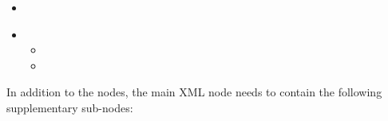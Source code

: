 %
\attrIntro

\begin{itemize}
  \itemsep0em
  \item \nameDescription
\end{itemize}


\begin{itemize}
  \item \variableDescription
    \variableChildrenIntro
    \begin{itemize}
      \item \distributionDescription
    \item \functionDescription
    \end{itemize}
\end{itemize}

In addition to the  nodes, the main XML node
 needs to contain the following supplementary sub-nodes:

